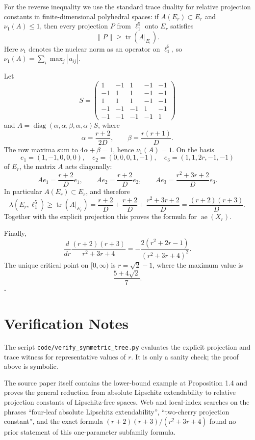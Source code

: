 \documentclass[11pt]{article}
\newcommand{\aext}{\operatorname{ae}}
\newcommand{\tr}{\operatorname{tr}}
\begin{document}
For the reverse inequality we use the standard trace duality for relative
projection constants in finite-dimensional polyhedral spaces: if
\(A(E_r)\subset E_r\) and \(\nu_1(A)\leq1\), then every projection \(P\) from
\(\ell_1^5\) onto \(E_r\) satisfies
\[
   \|P\|\geq \tr(A|_{E_r}).
\]
Here \(\nu_1\) denotes the nuclear norm as an operator on \(\ell_1^5\), so
\(\nu_1(A)=\sum_i\max_j |a_{ij}|\).

Let
\[
S=\begin{pmatrix}
 1&-1& 1&-1&-1\\
-1& 1& 1&-1&-1\\
 1& 1& 1&-1&-1\\
-1&-1&-1& 1&-1\\
-1&-1&-1&-1& 1
\end{pmatrix}
\]
and \(A=\operatorname{diag}(\alpha,\alpha,\beta,\alpha,\alpha)S\), where
\[
  \alpha=\frac{r+2}{2D},\qquad
  \beta=\frac{r(r+1)}{D}.
\]
The row maxima sum to \(4\alpha+\beta=1\), hence \(\nu_1(A)=1\).  On the basis
\[
 e_1=(1,-1,0,0,0),\quad
 e_2=(0,0,0,1,-1),\quad
 e_3=(1,1,2r,-1,-1)
\]
of \(E_r\), the matrix \(A\) acts diagonally:
\[
  Ae_1=\frac{r+2}{D}e_1,\qquad
  Ae_2=\frac{r+2}{D}e_2,\qquad
  Ae_3=\frac{r^2+3r+2}{D}e_3 .
\]
In particular \(A(E_r)\subset E_r\), and therefore
\[
 \lambda(E_r,\ell_1^5)
 \geq \tr(A|_{E_r})
 =\frac{r+2}{D}+\frac{r+2}{D}+\frac{r^2+3r+2}{D}
 =\frac{(r+2)(r+3)}{D}.
\]
Together with the explicit projection this proves the formula for
\(\aext(X_r)\).

Finally,
\[
  \frac{d}{dr}\frac{(r+2)(r+3)}{r^2+3r+4}
  =-\frac{2(r^2+2r-1)}{(r^2+3r+4)^2}.
\]
The unique critical point on \([0,\infty)\) is \(r=\sqrt2-1\), where the
maximum value is
\[
  \frac{5+4\sqrt2}{7}.
\]
\(\square\)

\section*{Verification Notes}

The script \texttt{code/verify\_symmetric\_tree.py} evaluates the explicit
projection and trace witness for representative values of \(r\).  It is only a
sanity check; the proof above is symbolic.

The source paper itself contains the lower-bound example at Proposition 1.4
and proves the general reduction from absolute Lipschitz extendability to
relative projection constants of Lipschitz-free spaces.  Web and local-index
searches on the phrases ``four-leaf absolute Lipschitz extendability'',
``two-cherry projection constant'', and the exact formula
\((r+2)(r+3)/(r^2+3r+4)\) found no prior statement of this one-parameter
subfamily formula.
\end{document}
